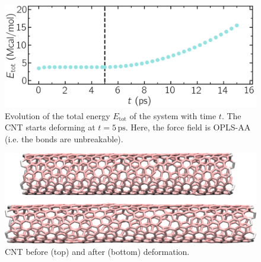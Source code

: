 \documentclass[9pt,tutorial]{livecoms}
\begin{document}
\begin{figure}
\centering
\includegraphics[width=\linewidth]{CNT-energy-unbreakable}
\caption{Evolution of the total energy $E_\text{tot}$ of the system with time $t$. The CNT starts deforming at $t = 5\,\text{ps}$. Here, the force field is OPLS-AA (i.e. the bonds are unbreakable).}
\label{fig:CNT-unbreakable-energy}
\end{figure}

\begin{figure}
\centering
\includegraphics[width=\linewidth]{CNT-deformed-unbreakable}
\caption{CNT before (top) and after (bottom) deformation.}
\label{fig:CNT-deformed-unbreakable}
\end{figure}
\end{document}
